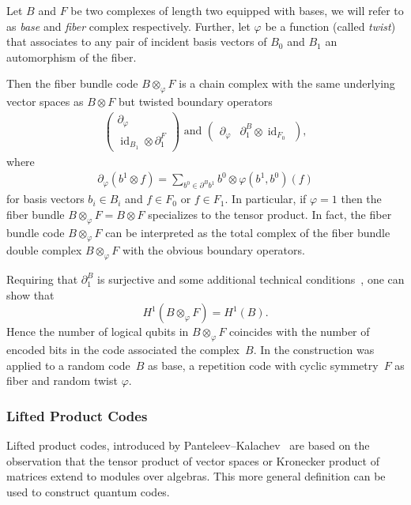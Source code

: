 \documentclass[amsmath, amssymb, floatfix, reprint, twocolumn, notitlepage, 10pt]{revtex4-1}
\newcommand{\id}{\operatorname{id}}
\begin{document}
Let $B$ and $F$ be two complexes of length two equipped with bases, we will refer to as  \emph{base} and \emph{fiber} complex respectively. Further, let 
$\varphi$ be a function (called \emph{twist}) that associates to any pair of incident basis vectors of $B_0$ and $B_1$ an automorphism of the fiber.

Then the fiber bundle code $B\otimes_\varphi F$ is a chain complex with the same underlying vector spaces as $B\otimes F$ but twisted boundary operators
\begin{align*}
\begin{pmatrix} \partial_\varphi\\ \id_{B_1}\otimes\partial^F_1  \end{pmatrix}\text{ and }\begin{pmatrix}\partial_\varphi & \partial^B_1\otimes \id_{F_0}  \end{pmatrix},
\end{align*}
where
\begin{align*}
\partial_{\varphi}(b^{1}\otimes f)=\sum_{b^{0}\in\partial^{B}b^{1}}b^{0}\otimes \varphi(b^{1},b^{0})(f)
\end{align*}
for basis vectors $b_i\in B_i$ and $f\in F_0$ or $f\in F_1.$ In particular, if $\varphi=1$ then the fiber bundle $B\otimes_\varphi F=B\otimes F$ specializes to the tensor product. In fact, the fiber bundle code $B\otimes_\varphi F$ can be interpreted as the total complex of the fiber bundle double complex $B\otimes_\varphi F$ with the obvious boundary operators.

Requiring that $\partial_1^B$ is surjective and some additional technical conditions~\cite{hastings2020fiber}, one can show that 
$$H^1(B\otimes_\varphi F)=H^1(B).$$
Hence the number of logical qubits in $B\otimes_\varphi F$ coincides with the number of encoded bits in the code associated the complex~$B.$
In \cite{hastings2020fiber} the construction was applied to a random code~$B$ as base, a repetition code with cyclic symmetry~$F$ as fiber and random twist $\varphi.$




\subsubsection{Lifted Product Codes}\label{app:liftedproducts}
Lifted product codes, introduced by Panteleev--Kalachev~\cite{panteleev2019degenerate,panteleev2020quantum} are based on the observation that the tensor product of vector spaces or Kronecker product of matrices extend to modules over algebras. This more general definition can be used to construct quantum codes.
\end{document}
